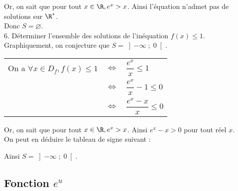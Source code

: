 \vspace*{.3cm}

Or, on sait que pour tout $x \in \R, e^x > x$. Ainsi l'équation n'admet pas de solutions sur $\R^*$. \\

Donc $S = \varnothing$. \\

6. Déterminer l'ensemble des solutions de l'inéquation $f(x) \leqslant 1$. \\

Graphiquement, on conjecture que $S = \left]-\infty \; ; \; 0\right[$. \\

\begin{tabular}{lll}
\hspace{-.3cm} On a $\forall x \in D_f, f(x) \leqslant 1$ & $\Longleftrightarrow$ & $ \dfrac{e^x}{x} \leqslant 1$ \vspace*{.3cm} \\
& $\Longleftrightarrow$ & $\dfrac{e^x}{x} - 1 \leqslant 0$ \vspace*{.3cm} \\
& $\Longleftrightarrow$ & $\dfrac{e^x - x}{x} \leqslant 0$ \\
\end{tabular}

\vspace*{.3cm}

Or, on sait que pour tout $x \in \R, e^x > x$. Ainsi $e^x - x > 0$ pour tout réel $x$. \\

On peut en déduire le tableau de signe suivant : \\


\vspace*{.3cm}

Ainsi $S = \left]-\infty \; ; \; 0 \right[$.

\newpage

\vspace*{-2cm}

\subsection{Fonction $e^u$}

